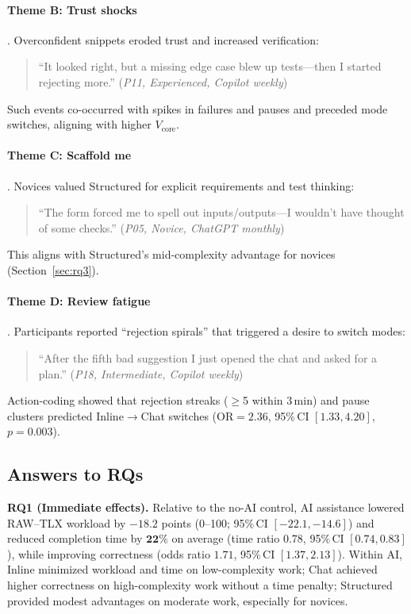 \documentclass[sigconf]{acmart}
\begin{document}
\paragraph{Theme B: Trust shocks}.
Overconfident snippets eroded trust and increased verification:
\begin{quote}\small
``It looked right, but a missing edge case blew up tests---then I started rejecting more.'' (\textit{P11, Experienced, Copilot weekly})
\end{quote}
Such events co-occurred with spikes in failures and pauses and preceded mode switches, aligning with higher $V_{\text{core}}$.

\paragraph{Theme C: Scaffold me}.
Novices valued Structured for explicit requirements and test thinking:
\begin{quote}\small
``The form forced me to spell out inputs/outputs---I wouldn't have thought of some checks.'' (\textit{P05, Novice, ChatGPT monthly})
\end{quote}
This aligns with Structured’s mid-complexity advantage for novices (Section~\ref{sec:rq3}).

\paragraph{Theme D: Review fatigue}.
Participants reported ``rejection spirals'' that triggered a desire to switch modes:
\begin{quote}\small
``After the fifth bad suggestion I just opened the chat and asked for a plan.'' (\textit{P18, Intermediate, Copilot weekly})
\end{quote}
Action-coding showed that rejection streaks ($\geq$5 within 3\,min) and pause clusters predicted Inline$\rightarrow$Chat switches (OR$=2.36$, 95\%\,CI $[1.33, 4.20]$, $p{=}0.003$).


\subsection{Answers to RQs}
\label{sec:rq-summary}

\textbf{RQ1 (Immediate effects).} Relative to the no-AI control, AI assistance lowered RAW--TLX workload by $\mathbf{-18.2}$ points (0--100; 95\%\,CI $[{-}22.1,{-}14.6]$) and reduced completion time by $\mathbf{22\%}$ on average (time ratio $0.78$, 95\%\,CI $[0.74,0.83]$), while improving correctness (odds ratio $\mathbf{1.71}$, 95\%\,CI $[1.37,2.13]$). Within AI, Inline minimized workload and time on low-complexity work; Chat achieved higher correctness on high-complexity work without a time penalty; Structured provided modest advantages on moderate work, especially for novices.
\end{document}
